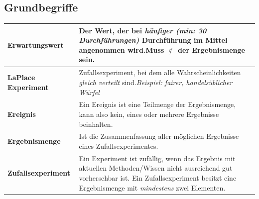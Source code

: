 \documentclass[a4paper, 15pt]{article}
\begin{document}
\begin{minipage}[right]{0.5\textwidth}
\begin{center}
\end{center}
\begin{center}
\end{center}
\begin{center}
\end{center}
\end{minipage}
\subsection{Grundbegriffe}
\begin{table}[h]
\begin{tabularx}{17cm}{|XX|}
\hline
\textbf{Erwartungswert}&Der Wert, der bei \textit{häufiger (min: 30 Durchführungen)} Durchführung im Mittel angenommen wird.\newline Muss $\notin$ der Ergebnismenge sein. \\
\hline
\textbf{LaPlace Experiment}&Zufallsexperiment, bei dem alle Wahrscheinlichkeiten \textit{gleich verteilt} sind.\newline \textit{Beispiel: fairer, handelsüblicher Würfel} \\
\hline
\textbf{Ereignis}&Ein Ereignis ist eine Teilmenge der Ergebnismenge, kann also kein, eines oder mehrere Ergebnisse beinhalten. \\
\hline
\textbf{Ergebnismenge}&Ist die Zusammenfassung aller möglichen Ergebnisse eines Zufallsexperimentes. \\
\hline
\textbf{Zufallsexperiment}&Ein Experiment ist zufällig, wenn das Ergebnis mit aktuellen Methoden/Wissen nicht ausreichend gut vorhersehbar ist. Ein Zufallsexperiment besitzt eine Ergebnismenge mit \textit{mindestens} zwei Elementen.  \\
\hline
\end{tabularx}
\end{table}
\end{document}
